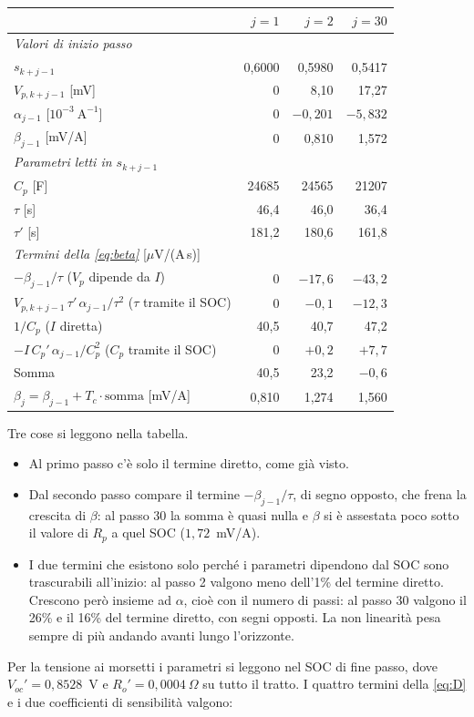 \documentclass[11pt,a4paper]{article}
\newcommand{\Tc}{T_c}
\begin{document}
\begin{center}
\begin{tabular}{lrrr}
\toprule
 & $j = 1$ & $j = 2$ & $j = 30$ \\
\midrule
\multicolumn{4}{l}{\emph{Valori di inizio passo}} \\
$s_{k+j-1}$ & 0,6000 & 0,5980 & 0,5417 \\
$V_{p,k+j-1}$ [mV] & 0 & 8,10 & 17,27 \\
$\alpha_{j-1}$ [$10^{-3}~\mathrm{A}^{-1}$] & 0 & $-0{,}201$ & $-5{,}832$ \\
$\beta_{j-1}$ [mV/A] & 0 & 0,810 & 1,572 \\
\midrule
\multicolumn{4}{l}{\emph{Parametri letti in $s_{k+j-1}$}} \\
$C_p$ [F] & 24685 & 24565 & 21207 \\
$\tau$ [s] & 46,4 & 46,0 & 36,4 \\
$\tau'$ [s] & 181,2 & 180,6 & 161,8 \\
\midrule
\multicolumn{4}{l}{\emph{Termini della \eqref{eq:beta}} [$\mu$V/(A\,s)]} \\
$-\beta_{j-1}/\tau$ \quad ($V_p$ dipende da $I$) & 0 & $-17{,}6$ & $-43{,}2$ \\
$V_{p,k+j-1}\,\tau'\,\alpha_{j-1}/\tau^2$ \quad ($\tau$ tramite il SOC) & 0 & $-0{,}1$ & $-12{,}3$ \\
$1/C_p$ \quad ($I$ diretta) & 40,5 & 40,7 & 47,2 \\
$-I\,C_p'\,\alpha_{j-1}/C_p^2$ \quad ($C_p$ tramite il SOC) & 0 & $+0{,}2$ & $+7{,}7$ \\
Somma & 40,5 & 23,2 & $-0{,}6$ \\
\midrule
$\beta_j = \beta_{j-1} + \Tc \cdot \text{somma}$ [mV/A] & 0,810 & 1,274 & 1,560 \\
\bottomrule
\end{tabular}
\end{center}

\noindent
Tre cose si leggono nella tabella.
\begin{itemize}
  \item Al primo passo c'è solo il termine diretto, come già visto.
  \item Dal secondo passo compare il termine $-\beta_{j-1}/\tau$, di segno
        opposto, che frena la crescita di $\beta$: al passo 30 la somma è
        quasi nulla e $\beta$ si è assestata poco sotto il valore di $R_p$ a
        quel SOC ($1{,}72$~mV/A).
  \item I due termini che esistono solo perché i parametri dipendono dal SOC
        sono trascurabili all'inizio: al passo 2 valgono meno dell'1\% del
        termine diretto. Crescono però insieme ad $\alpha$, cioè con il numero
        di passi: al passo 30 valgono il 26\% e il 16\% del termine diretto,
        con segni opposti. La non linearità pesa sempre di più andando avanti
        lungo l'orizzonte.
\end{itemize}
Per la tensione ai morsetti i parametri si leggono nel SOC di fine passo, dove
$V_{oc}' = 0{,}8528$~V e $R_o' = 0{,}0004~\Omega$ su tutto il tratto. I quattro
termini della \eqref{eq:D} e i due coefficienti di sensibilità valgono:
\end{document}
